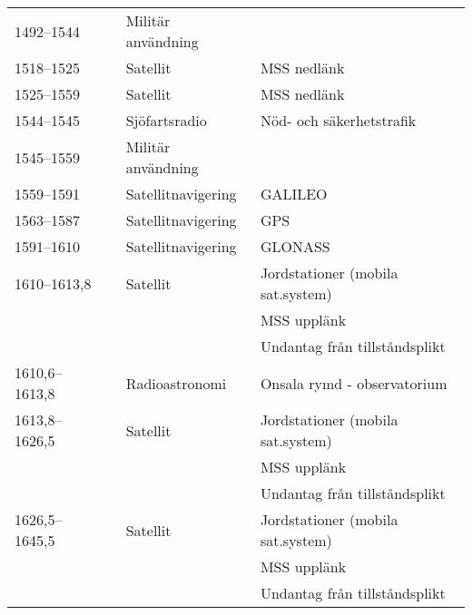 \begin{landscape}
\begin{longtable}{llll}
	1492--1544         &                    & Militär användning      &  \\
	1518--1525         &                    & Satellit                & MSS nedlänk                              \\
	1525--1559         &                    & Satellit                & MSS nedlänk                              \\
	1544--1545         &                    & Sjöfartsradio           & Nöd- och säkerhetstrafik                 \\
	1545--1559         &                    & Militär användning      &  \\
	1559--1591         &                    & Satellitnavigering      & GALILEO                                  \\
	1563--1587         &                    & Satellitnavigering      & GPS                                      \\
	1591--1610         &                    & Satellitnavigering      & GLONASS                                  \\
	1610--1613,8       &                    & Satellit                & Jordstationer (mobila sat.system)        \\
	                   &                    &                         & MSS upplänk                              \\
	                   &                    &                         & Undantag från tillståndsplikt            \\
	1610,6--1613,8     &                    & Radioastronomi          & Onsala rymd - observatorium              \\
	1613,8--1626,5     &                    & Satellit                & Jordstationer (mobila sat.system)        \\
	                   &                    &                         & MSS upplänk                              \\
	                   &                    &                         & Undantag från tillståndsplikt            \\
	1626,5--1645,5     &                    & Satellit                & Jordstationer (mobila sat.system)        \\
	                   &                    &                         & MSS upplänk                              \\
	                   &                    &                         & Undantag från tillståndsplikt            \\

\end{longtable}
\end{landscape}
